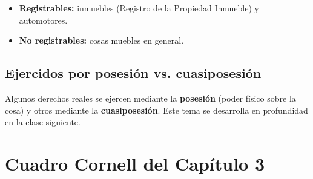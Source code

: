\documentclass[12pt,oneside]{book}
\begin{document}
\begin{itemize}
    \item \textbf{Registrables:} inmuebles (Registro de la Propiedad Inmueble) y automotores.
    \item \textbf{No registrables:} cosas muebles en general.
\end{itemize}

\subsection{Ejercidos por posesi\'on vs. cuasiposesi\'on}

Algunos derechos reales se ejercen mediante la \textbf{posesi\'on} (poder f\'isico sobre la cosa) y otros mediante la \textbf{cuasiposesi\'on}. Este tema se desarrolla en profundidad en la clase siguiente.

\section{Cuadro Cornell del Cap\'itulo 3}
\end{document}
